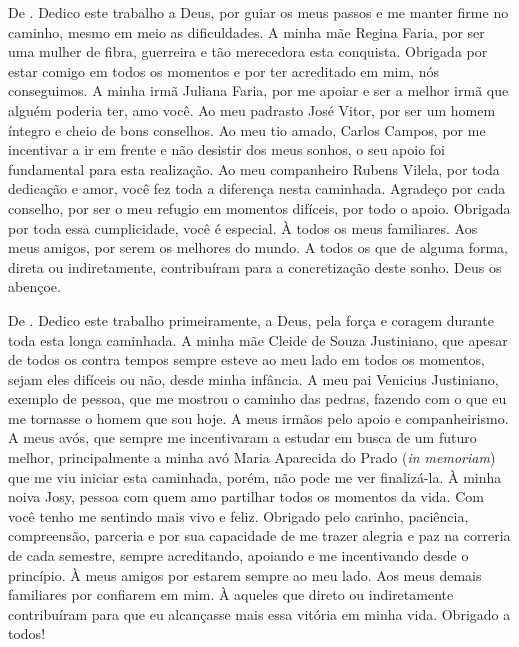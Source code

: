 \begin{dedicatoria}
\vspace*{\fill}
\vspace*{\fill}
\vspace*{\fill}
\vspace*{\fill}
\vspace*{\fill}
\vspace*{\fill}
De \imprimirAutorUm.
\newline
Dedico este trabalho a Deus, por guiar os meus passos e me manter firme no caminho, mesmo em meio as dificuldades. A minha mãe Regina Faria, por ser uma mulher de fibra, guerreira e tão merecedora esta conquista. Obrigada por estar comigo em todos os momentos e por ter acreditado em mim, nós conseguimos. A minha irmã Juliana Faria, por me apoiar e ser a melhor irmã que alguém poderia ter, amo você. Ao meu padrasto José Vitor, por ser um homem íntegro e cheio de bons conselhos. Ao meu tio amado, Carlos Campos, por me incentivar a ir em frente e não desistir dos meus sonhos, o seu apoio foi fundamental para esta realização. Ao meu companheiro Rubens Vilela, por toda dedicação e amor, você fez toda a diferença nesta caminhada. Agradeço por cada conselho, por ser o meu refugio em momentos difíceis, por todo o apoio. Obrigada por toda essa cumplicidade, você é especial. À todos os meus familiares. Aos meus amigos, por serem os melhores do mundo. A todos os que de alguma forma, direta ou indiretamente, contribuíram para a concretização deste sonho. Deus os abençoe.

\vspace*{\fill}
De \imprimirAutorDois.
\newline
Dedico este trabalho primeiramente, a Deus, pela força e coragem durante toda esta longa caminhada. A minha mãe Cleide de Souza Justiniano, que apesar de todos os contra tempos sempre esteve ao meu lado em todos os momentos, sejam eles difíceis ou não, desde minha infância. A meu pai Venicius Justiniano, exemplo de pessoa, que me mostrou o caminho das pedras, fazendo com o que eu me tornasse o homem que sou hoje. A meus irmãos pelo apoio e companheirismo. A meus avós, que sempre me incentivaram a estudar em busca de um futuro melhor, principalmente a minha avó Maria Aparecida do Prado (\textit{in memoriam}) que me viu iniciar esta caminhada, porém, não pode me ver finalizá-la. À minha noiva Josy, pessoa com quem amo partilhar todos os momentos da vida. Com você tenho me sentindo mais vivo e feliz. Obrigado pelo carinho, paciência, compreensão, parceria e por sua capacidade de me trazer alegria e paz na correria de cada semestre, sempre acreditando, apoiando e me incentivando desde o princípio. À meus amigos por estarem sempre ao meu lado. Aos meus demais familiares por confiarem em mim. À aqueles que direto ou indiretamente contribuíram para que eu alcançasse mais essa vitória em minha vida. Obrigado a todos!
\end{dedicatoria}
